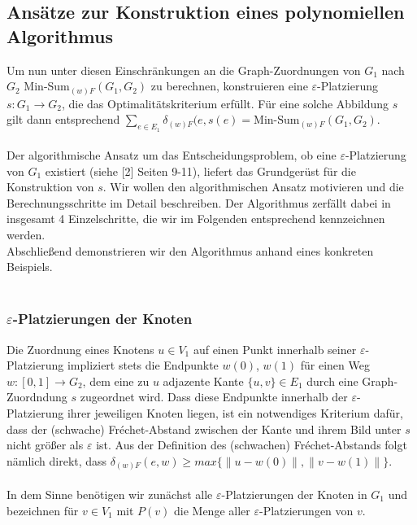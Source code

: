 \documentclass[a4paper, 12pt, twoside]{article}
\theoremstyle{Format1} %
\begin{document}
\subsection{Ansätze zur Konstruktion eines polynomiellen Algorithmus} \label{Grundidee des Algorithmus}
Um nun unter diesen Einschränkungen an die Graph-Zuordnungen von $G_1$ nach $G_2$ Min-Sum$_{(w)F}(G_1,G_2)$ zu berechnen, konstruieren
eine $\varepsilon$-Platzierung $s: G_1 \to G_2$, die das Optimalitätskriterium erfüllt.
Für eine solche Abbildung $s$ gilt dann entsprechend $\sum_{e \in E_1}\delta_{(w)F}(e, s(e) = \text{Min-Sum}_{(w)F}(G_1,G_2)$.
\\
\\
Der algorithmische Ansatz um das Entscheidungsproblem, ob eine $\varepsilon$-Platzierung von $G_1$ existiert (siehe [2] Seiten 9-11), liefert das
Grundgerüst für die Konstruktion von $s$. Wir wollen den algorithmischen Ansatz motivieren und die Berechnungsschritte im Detail beschreiben.
Der Algorithmus zerfällt dabei in insgesamt 4 Einzelschritte, die wir im Folgenden entsprechend kennzeichnen werden.
\\
Abschließend demonstrieren wir den Algorithmus anhand eines konkreten Beispiels.
\\
\\
\subsubsection{$\varepsilon$-Platzierungen der Knoten} \label{Platzierungen der Knoten}
Die Zuordnung eines Knotens $u \in V_1$ auf einen Punkt innerhalb seiner $\varepsilon$-Platzierung impliziert stets die Endpunkte $w(0)$, $w(1)$
für einen Weg $w: [0,1] \to G_2$, dem eine zu $u$ adjazente Kante $\{u,v\} \in E_1$ durch eine Graph-Zuordndung $s$ zugeordnet wird.
Dass diese Endpunkte innerhalb der $\varepsilon$-Platzierung ihrer jeweiligen Knoten liegen, ist ein notwendiges Kriterium dafür, dass der (schwache) Fréchet-Abstand
zwischen der Kante und ihrem Bild unter $s$ nicht größer als $\varepsilon$ ist. Aus der Definition des (schwachen) Fréchet-Abstands folgt nämlich direkt, dass
$\delta_{(w)F}(e, w) \geq max{\{\|u-w(0)\|, \|v-w(1)\|\}}$.
\\
\\
In dem Sinne benötigen wir zunächst alle $\varepsilon$-Platzierungen der Knoten in $G_1$ und bezeichnen für $v \in V_1$ mit $P(v)$ die Menge aller $\varepsilon$-Platzierungen von $v$.
\end{document}
